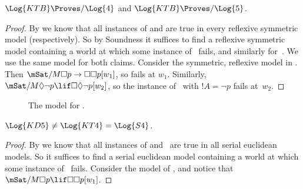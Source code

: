 \documentclass[../../../include/open-logic-section]{subfiles}
\begin{document}
\begin{thm}
  $\Log{KTB} \Proves/ \Log{4}$ and $\Log{KTB} \Proves/ \Log{5}$.
\end{thm}

\begin{proof}
  By  we know that all instances of
   and  are true in every reflexive symmetric model
  (respectively). So by Soundness it suffices to find a reflexive
  symmetric model containing a world at which some instance of~
  fails, and similarly for~.  We use the same model for both
  claims. Consider the symmetric, reflexive model in
  .  Then $\mSat/{M}{\Box p \to \Box \Box
    p}[w_1]$, so  fails at $w_1$. Similarly, $\mSat/{M}{\Diamond
    \lnot p \lif \Box \Diamond \lnot p}[w_2]$, so the instance
  of~ with $!A = \lnot p$ fails at~$w_2$.
\end{proof}

\begin{figure}[htpb]
  \centering
  \caption{The model for .}
\end{figure}

\begin{thm}
  $\Log{KD5} \neq \Log{KT4} = \Log{S4}$.
\end{thm}

\begin{proof}
  By  we know that all instances of
   and~ are true in all serial euclidean models.
  So  it suffices to find a serial euclidean model containing a world
  at which some instance of~ fails.  Consider the model of
  , and notice that $\mSat/{M}{\Box p
  \lif \Box\Box p}[w_1]$. 
\end{proof}
\end{document}
